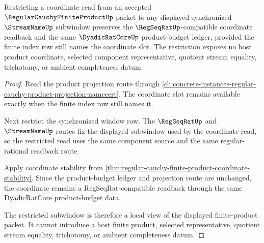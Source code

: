 \begin{theorem}
\label{thm:regular-cauchy-finite-product-window-restriction}
Restricting a coordinate read from an accepted $\RegularCauchyFiniteProductUp$ packet to any displayed synchronized $\StreamNameUp$ subwindow preserves the $\RegSeqRatUp$-compatible coordinate readback and the same $\DyadicRatCoreUp$ product-budget ledger, provided the finite index row still names the coordinate slot. The restriction exposes no host product coordinate, selected component representative, quotient stream equality, trichotomy, or ambient completeness datum.
\end{theorem}
\begin{proof}
Read the product projection route through \autoref{ch:concrete-instances-regular-cauchy-product-projection-namecert}. The coordinate slot remains available exactly when the finite index row still names it.

Next restrict the synchronized window row. The $\RegSeqRatUp$ and $\StreamNameUp$ routes fix the displayed subwindow used by the coordinate read, so the restricted read uses the same component source and the same regular-rational readback route.

Apply coordinate stability from \autoref{thm:regular-cauchy-finite-product-coordinate-stability}. Since the product-budget ledger and projection route are unchanged, the coordinate remains a RegSeqRat-compatible readback through the same DyadicRatCore product-budget data.

The restricted subwindow is therefore a local view of the displayed finite-product packet. It cannot introduce a host finite product, selected representative, quotient stream equality, trichotomy, or ambient completeness datum.
\end{proof}

